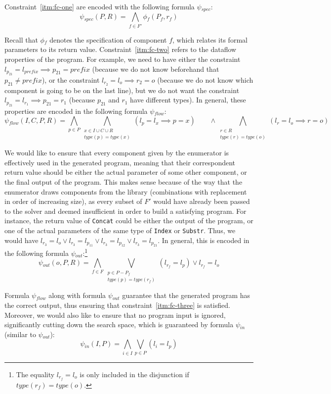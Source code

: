 Constraint~\ref{itm:fc-one} are encoded with the following formula $\psi{}_{spec}$:
%
\[
  \psi{}_{spec}(P, R) = \bigwedge_{f \in F'} \phi{}_f (P_f, r_f)
\]

\noindent
Recall that $\phi{}_f$ denotes the specification of component $f$, which relates
its formal parameters to its return value.
Constraint~\ref{itm:fc-two} refers to
the dataflow properties of the program. For example, we need to have 
either the constraint $l_{p_{21}} = l_{prefix} \implies p_{21} = prefix$
(because we do not know beforehand that $p_{21} \neq prefix$),
or the constraint $l_{r_2} = l_o \implies r_2 = o$
(because we do not know which component is going to be on the last line),
but we do not want the constraint $l_{p_{21}} = l_{r_1} \implies p_{21} = r_1$
(because $p_{21}$ and $r_1$ have different types).
In general, these properties are encoded in the following formula $\psi{}_{flow}$:
%
\[
  \psi{}_{flow}(I, C, P, R) =
    \bigwedge_{p \in P}
    \bigwedge_{\substack{x \in I \cup C \cup R \\ type(p) = type(x)}} 
    (l_p = l_x \implies p = x)
    \qquad \wedge \bigwedge_{\substack{r \in R \\ type(r) = type(o)}}
    (l_r = l_o \implies r = o)
\]

\noindent
We would like to ensure that every component given by the enumerator is
effectively used in the generated program, meaning that their correspondent
return value should be either the actual parameter of some other component, or
the final output of the program. This makes sense because of the way that the
enumerator draws components from the library (combinations with replacement in
order of increasing size), as every subset of $F'$ would have already been
passed to the solver and deemed insufficient in order to build a satisfying
program. For instance, the return value of \lstinline{Concat} could be either
the output of the program, or one of the actual parameters of the same type of
\lstinline{Index} or \lstinline{Substr}. Thus, we would have
$l_{r_3} = l_o \vee l_{r_3} = l_{p_{11}} \vee l_{r_3} = l_{p_{12}} \vee l_{r_3} = l_{p_{21}}$.
In general, this is encoded in the following formula
$\psi{}_{out}$:\footnote{The equality $l_{r_f} = l_o$ is only included in the
  disjunction if $type(r_f) = type(o)$.}
%
\[
  \psi{}_{out}(o, P, R) =
  \bigwedge_{f \in F}
  \bigvee_{\substack{p \in P - P_f \\ type(p) = type(r_f)}}(l_{r_f} = l_p)
  \vee l_{r_f} = l_o
\]

\noindent
Formula $\psi{}_{flow}$ along with formula $\psi{}_{out}$ guarantee that the generated
program has the correct output, thus ensuring that constraint~\ref{itm:fc-three}
is satisfied. Moreover, we would also like to ensure that no program input
is ignored, significantly cutting down the search space, which is guaranteed
by formula $\psi{}_{in}$ (similar to $\psi{}_{out}$):
%
\[
  \psi{}_{in}(I, P) = \bigwedge_{i \in I}\bigvee_{p \in P}(l_i = l_p)
\]

